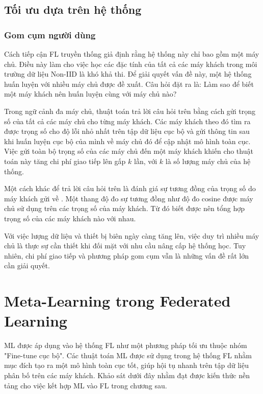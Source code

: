 \subsection{Tối ưu dựa trên hệ thống}

\subsubsection{Gom cụm người dùng}

Cách tiếp cận FL truyền thống giả định rằng hệ thống này chỉ bao gồm một máy chủ. Điều này làm cho việc học các đặc tính của tất cả các máy khách trong môi trường dữ liệu Non-IID là khó khả thi. Để giải quyết vấn đề này, một hệ thống huấn luyện với nhiều máy chủ được đề xuất. Câu hỏi đặt ra là: Làm sao để biết một máy khách nên huấn luyện cùng với máy chủ nào? 

Trong ngữ cảnh đa máy chủ, thuật toán  \cite{ghosh2020efficient} trả lời câu hỏi trên bằng cách gửi trọng số của tất cả các máy chủ cho từng máy khách. Các máy khách theo đó tìm ra được trọng số cho độ lỗi nhỏ nhất trên tập dữ liệu cục bộ và gửi thông tin sau khi huấn luyện cục bộ của mình về máy chủ đó để cập nhật mô hình toàn cục. Việc gửi toàn bộ trọng số của các máy chủ đến một máy khách khiến cho thuật toán này tăng chi phí giao tiếp lên gấp $k$ lần, với $k$ là số lượng máy chủ của hệ thống.

Một cách khác để trả lời câu hỏi trên là đánh giá sự tương đồng của trọng số do máy khách gửi về \cite{zhu2021federated}. Một thang độ đo sự tương đồng như độ đo cosine được máy chủ sử dụng trên các trọng số của máy khách. Từ đó biết được nên tổng hợp trọng số của các máy khách nào với nhau.

Với việc lượng dữ liệu và thiết bị biên ngày càng tăng lên, việc duy trì nhiều máy chủ là thực sự cần thiết khi đối mặt với nhu cầu nâng cấp hệ thống học. Tuy nhiên, chi phí giao tiếp và phương pháp gom cụm vẫn là những vấn đề rất lớn cần giải quyết.

\section{Meta-Learning trong Federated Learning}

ML được áp dụng vào hệ thống FL như một phương pháp tối ưu thuộc nhóm "Fine-tune cục bộ". Các thuật toán ML được sử dụng trong hệ thống FL nhằm mục đích tạo ra một mô hình toàn cục tốt, giúp hội tụ nhanh trên tập dữ liệu phân bố trên các máy khách. Khảo sát dưới đây nhằm đạt được kiến thức nền tảng cho việc kết hợp ML vào FL trong chương sau.


